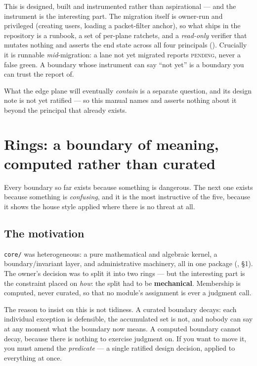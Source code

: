 This is designed, built and instrumented rather than aspirational --- and the
instrument is the interesting part. The migration itself is owner-run and
privileged (creating users, loading a packet-filter anchor), so what ships in the
repository is a runbook, a set of per-plane ratchets, and a \emph{read-only}
verifier that mutates nothing and asserts the end state across all four principals
(). Crucially it is runnable
\emph{mid}-migration: a lane not yet migrated reports \textsc{pending}, never a
false green. A boundary whose instrument can say ``not yet'' is a boundary you can
trust the report of.

What the edge plane will eventually \emph{contain} is a separate question, and its
design note is not yet ratified --- so this manual names
 and asserts nothing about it beyond the
principal that already exists.

\section{Rings: a boundary of meaning, computed rather than curated}
\label{sec:rings}

Every boundary so far exists because something is dangerous. The next one exists
because something is \emph{confusing}, and it is the most instructive of the five,
because it shows the house style applied where there is no threat at all.

\subsection*{The motivation}

\texttt{core/} was heterogeneous: a pure mathematical and algebraic kernel, a
boundary/invariant layer, and administrative machinery, all in one package
(, \S 1). The owner's decision was to split it into
two rings --- but the interesting part is the constraint placed on \emph{how}: the
split had to be \textbf{mechanical}. Membership is computed, never curated, so that
no module's assignment is ever a judgment call.

The reason to insist on this is not tidiness. A curated boundary decays: each
individual exception is defensible, the accumulated set is not, and nobody can say
at any moment what the boundary now means. A computed boundary cannot decay,
because there is nothing to exercise judgment on. If you want to move it, you must
amend the \emph{predicate} --- a single ratified design decision, applied to
everything at once.

